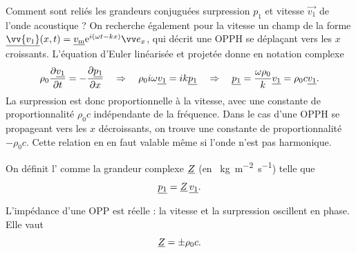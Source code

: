 \documentclass[12pt,fancy]{cours}
\begin{document}

Comment sont reliés les grandeurs conjuguées surpression $p_1$ et vitesse $\Vec{v_1}$ de l'onde acoustique ?
On recherche également pour la vitesse un champ de la forme $\underline{\vv{v_1}}(x,t)=\udl{v_{\rm{m}}}\e^{i(\omega t-k x)}\ex$, qui décrit une OPPH se déplaçant vers les $x$ croissants.
L'équation d'Euler linéarisée et projetée donne en notation complexe
\begin{equation}
	\rho_0 \frac{\partial{\underline{v_1}}}{\partial{t}} = - \frac{\partial{\underline{p_1}}}{\partial{x}} \quad \Rightarrow \quad \rho_0 i\omega\underline{{v_1}}=ik\underline{p_1} \quad\Rightarrow\quad  \underline{p_1} = \frac{\omega \rho_0}{k}  \underline{v_1} =  \rho_0 c \underline{v_1}.
\end{equation}
La surpression est donc proportionnelle à la vitesse, avec une constante de proportionnalité $\rho_0 c$ indépendante de la fréquence. Dans le cas d’une OPPH se propageant vers les $x$ décroissants, on trouve une constante de proportionnalité $-\rho_0 c$.
Cette relation en en faut valable même si l'onde n'est pas harmonique.
\begin{definition}\label{def:}
	On définit l’ comme la grandeur complexe $\underline{Z}$ (en \SI{}{kg.m^{-2}.s^{-1}}) telle que
	$$
\underline{p_1} = \underline{Z} \, \underline{v_1}.
	$$
\end{definition}
\begin{prop}\label{prop:}
	L’impédance d’une OPP est réelle	: la vitesse et la surpression oscillent en phase. Elle vaut 
	$$\underline{Z} = \pm\rho_0 c.$$
\end{prop}
\end{document}
